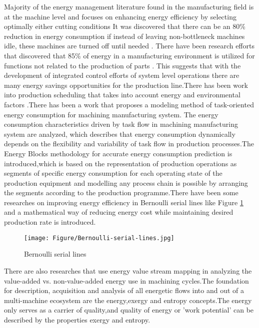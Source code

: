 Majority of the energy management literature found in the manufacturing field is at the machine level and focuses on enhancing energy efficiency by selecting optimally either cutting conditions It was discovered that there can be an 80\% reduction in energy consumption if instead of leaving non-bottleneck machines idle, these machines are turned off until needed \cite{Gilles2007}. There have been research efforts that discovered that 85\% of energy in a manufacturing environment is utilized for functions not related to the production of parts \cite{Gutowski2005}. This suggests that with the development of integrated control efforts of system level operations there are many energy savings opportunities for the production line.There has been work into production scheduling that takes into account energy and environmental factors \cite{Fang2011}.There has been a work that proposes a modeling method of task-oriented energy consumption for machining manufacturing system. The energy consumption characteristics driven by task flow in machining manufacturing system are analyzed, which describes that energy consumption dynamically depends on the flexibility and variability of task flow in production processes\cite{He2012}.The Energy Blocks methodology for accurate energy consumption prediction is introduced,which is based on the representation of production operations as segments of specific energy consumption for each operating state of the production equipment and modelling any process chain is possible by arranging the segments according to the production programme\cite{Weinert2011}.There have been some researches on improving energy efficiency in Bernoulli serial lines like Figure \ref{fig:Bernoulli-serial-lines} and a mathematical way of reducing energy cost while maintaining desired production rate is introduced\cite{Wen2016}. 

\begin{figure}[h!]
	\centering
	\texttt{[image: Figure/Bernoulli-serial-lines.jpg]}
	\caption{Bernoulli serial lines}
	\label{fig:Bernoulli-serial-lines}
\end{figure}

There are also researches that use energy value stream mapping in analyzing the value-added vs. non-value-added energy use in machining cycles\cite{Muller2014}.The foundation for description, acquisition and analysis of all energetic flows into and out of a multi-machine ecosystem are the energy,exergy and entropy concepts.The energy only serves as a carrier of quality,and quality of energy or ’work potential’ can be described by the properties exergy and entropy\cite{Bejan2002}.

